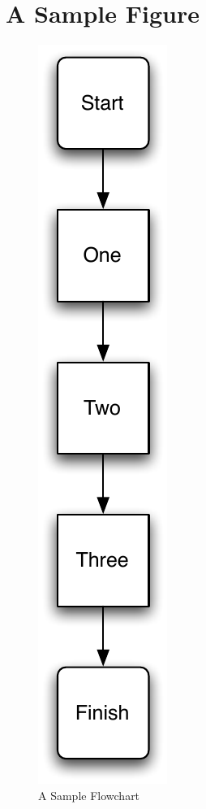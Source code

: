 \documentclass[nobinding]{sydeStyle}	%
\begin{document}
\section{A Sample Figure}
		\begin{figure}[h]
			\begin{center}
			\includegraphics[height=.5\textheight]{flow}
			\caption{A Sample Flowchart}
			\label{results}
			\end{center}
		\end{figure}
\end{document}
